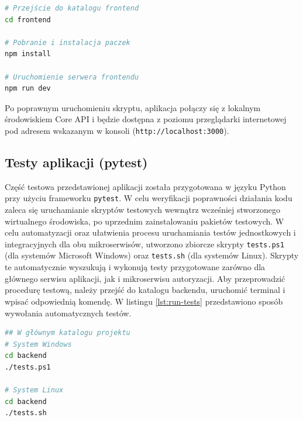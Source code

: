 \documentclass[12pt,twoside]{article}
\begin{document}
\begin{lstlisting}[language=bash, caption={Instalacja zależności i uruchomienie aplikacji React}, label={lst:run-front}]
# Przejście do katalogu frontend
cd frontend

# Pobranie i instalacja paczek
npm install

# Uruchomienie serwera frontendu
npm run dev 
\end{lstlisting}

Po poprawnym uruchomieniu skryptu, aplikacja połączy się z lokalnym środowiskiem Core API i będzie dostępna z poziomu przeglądarki internetowej pod adresem wskazanym w konsoli (\texttt{http://localhost:3000}).

\subsection{Testy aplikacji (pytest)}
Część testowa przedstawionej aplikacji została przygotowana w języku Python przy użyciu frameworku \texttt{pytest}. W celu weryfikacji poprawności działania kodu zaleca się uruchamianie skryptów testowych wewnątrz wcześniej stworzonego wirtualnego środowiska, po uprzednim zainstalowaniu pakietów testowych. W celu automatyzacji oraz ułatwienia procesu uruchamiania testów jednostkowych i integracyjnych dla obu mikroserwisów, utworzono zbiorcze skrypty \texttt{tests.ps1} (dla systemów Microsoft Windows) oraz \texttt{tests.sh} (dla systemów Linux). Skrypty te automatycznie wyszukują i wykonują testy przygotowane zarówno dla głównego serwisu aplikacji, jak i mikroserwisu autoryzacji. Aby przeprowadzić procedurę testową, należy przejść do katalogu backendu, uruchomić terminal i wpisać odpowiednią komendę. W listingu \ref{lst:run-tests} przedstawiono sposób wywołania automatycznych testów.

\begin{lstlisting}[language=bash, caption={Uruchomienie automatycznych testów jednostkowych i integracyjnych}, label={lst:run-tests}]
## W głównym katalogu projektu
# System Windows
cd backend
./tests.ps1

# System Linux
cd backend
./tests.sh
\end{lstlisting}
\end{document}
